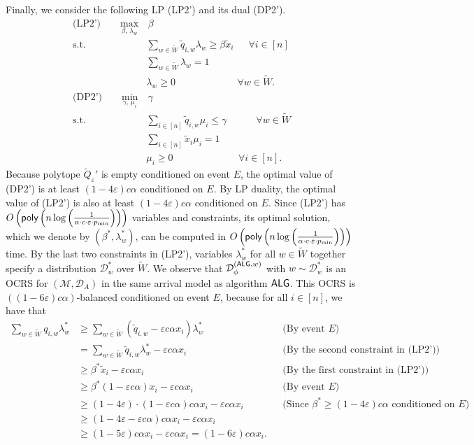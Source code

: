 \documentclass[11pt]{article}
\newcommand{\D}{\mathcal D}
\newcommand{\M}{{\mathcal M}}
\newcommand{\alg}{\textnormal{\sffamily ALG}}
\newcommand{\eps}{\varepsilon}
\newcommand{\poly}{\textnormal{\sffamily poly}}
\begin{document}
Finally, we consider the following LP (LP2') and its dual (DP2').
\begin{align*}
    \textrm{(LP2')}\qquad\max_{\beta,\,\lambda_w}&\,\beta\nonumber\\
    \textrm{s.t. }& \sum_{w\in \tilde{W}} \tilde{q}_{i,w}\lambda_w\ge\beta \tilde{x}_i \quad\,\,\,\forall i\in [n]\nonumber\\
    & \sum_{w\in \tilde{W}}\lambda_w=1\nonumber\\
    & \lambda_w\ge 0 \qquad\qquad\qquad\,\,\forall w\in \tilde{W}.\nonumber\\
    \textrm{(DP2')}\qquad\min_{\gamma,\,\mu_i}&\,\gamma\nonumber\\
    \textrm{s.t. }& \sum_{i\in[n]} \tilde{q}_{i,w}\mu_i\le\gamma \qquad\,\,\,\,\,\,\forall w\in \tilde{W}\nonumber\\
    & \sum_{i\in[n]}\tilde{x}_i\mu_i=1\nonumber\\
    & \mu_i\ge 0 \qquad\qquad\qquad\,\,\,\,\forall i\in [n].
\end{align*}
Because polytope $\tilde{Q}_{\eps}'$ is empty conditioned on event $E$, the optimal value of (DP2') is at least $(1-4\eps)c\alpha$ conditioned on $E$. By LP duality, the optimal value of (LP2') is also at least $(1-4\eps)c\alpha$ conditioned on $E$. Since (LP2') has $O\left(\poly\left(n\log\left(\frac{1}{\alpha\cdot c\cdot\eps\cdot p_{\min}}\right)\right)\right)$ variables and constraints, its optimal solution, which we denote by $(\beta^*,\lambda_{w}^*)$, can be computed in $O\left(\poly\left(n\log\left(\frac{1}{\alpha\cdot c\cdot\eps\cdot p_{\min}}\right)\right)\right)$ time. By the last two constraints in (LP2'), variables $\lambda^*_{w}$ for all $w\in\tilde{W}$ together specify a distribution $\D_{w}^*$ over $\tilde{W}$. We observe that $\D_{\phi}^{(\alg,w)}$ with $w\sim\D_{w}^*$ is an OCRS for $(\M,\D_A)$ in the same arrival model as algorithm $\alg$. This OCRS is $((1-6\eps)c\alpha)$-balanced conditioned on event $E$, because for all $i\in[n]$, we have that
\begin{align*}
\sum_{w\in\tilde{W}}q_{i,w}\lambda_w^*&\ge\sum_{w\in\tilde{W}} (\tilde{q}_{i,w}-\eps c\alpha x_i)\lambda_w^* &&\text{(By event $E$)}\\
&=\sum_{w\in\tilde{W}}\tilde{q}_{i,w}\lambda_w^*-\eps c\alpha x_i &&\text{(By the second constraint in (LP2'))}\\
&\ge\beta^*\tilde{x}_i-\eps c\alpha x_i&&\text{(By the first constraint in (LP2'))}\\
&\ge\beta^*(1-\eps c\alpha)x_i-\eps c\alpha x_i&&\text{(By event $E$)}\\
&\ge(1-4\eps)\cdot(1-\eps c\alpha)c\alpha x_i-\eps c\alpha x_i&&\text{(Since $\beta^*\ge(1-4\eps)c\alpha$ conditioned on $E$)}\\
&\ge(1-4\eps-\eps c\alpha)c\alpha x_i-\eps c\alpha x_i\\
&\ge(1-5\eps)c\alpha x_i-\eps c\alpha x_i=(1-6\eps)c\alpha x_i.
\end{align*}
\end{document}
